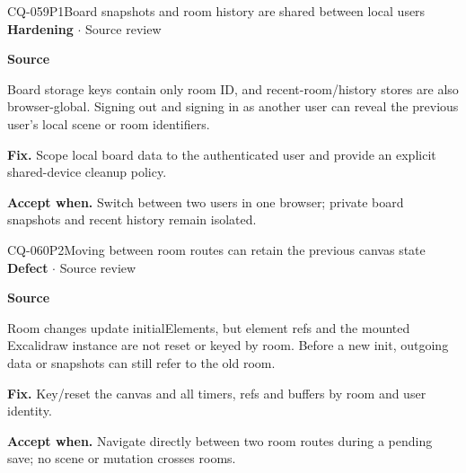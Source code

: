 \begin{finding}{CQ-059}{P1}{Board snapshots and room history are shared between local users}
\textbf{Hardening} $\cdot$ Source review\par
\textbf{Source}\quad{}\par
Board storage keys contain only room ID, and recent-room/history stores are also browser-global. Signing out and signing in as another user can reveal the previous user's local scene or room identifiers.\par
\textbf{Fix.} Scope local board data to the authenticated user and provide an explicit shared-device cleanup policy.\par
\textbf{Accept when.} Switch between two users in one browser; private board snapshots and recent history remain isolated.
\end{finding}
\begin{finding}{CQ-060}{P2}{Moving between room routes can retain the previous canvas state}
\textbf{Defect} $\cdot$ Source review\par
\textbf{Source}\quad{}\par
Room changes update initialElements, but element refs and the mounted Excalidraw instance are not reset or keyed by room. Before a new init, outgoing data or snapshots can still refer to the old room.\par
\textbf{Fix.} Key/reset the canvas and all timers, refs and buffers by room and user identity.\par
\textbf{Accept when.} Navigate directly between two room routes during a pending save; no scene or mutation crosses rooms.
\end{finding}
\clearpage
